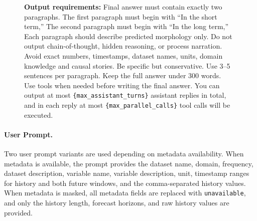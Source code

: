 \documentclass[11pt]{article}
\begin{document}
\begin{figure}[htbp]
\begin{tcolorbox}[
  boxrule=0.25pt,
  colback=promptBgSystem,
  colframe=black,
  colbacktitle=promptBgTitle,
  coltitle=black,
  title={Prompt: System},
  fonttitle=\bfseries,
  fontupper=\small
]
\textbf{Output requirements:} Final answer must contain exactly two paragraphs. The first paragraph must begin with ``In the short term,'' The second paragraph must begin with ``In the long term,'' Each paragraph should describe predicted morphology only. Do not output chain-of-thought, hidden reasoning, or process narration. Avoid exact numbers, timestamps, dataset names, units, domain knowledge and causal stories. Be specific but conservative. Use 3--5 sentences per paragraph. Keep the full answer under 300 words. \\

Use tools when needed before writing the final answer. You can output at most \texttt{\{max\_assistant\_turns\}} assistant replies in total, and in each reply at most \texttt{\{max\_parallel\_calls\}} tool calls will be executed.
\end{tcolorbox}
\end{figure}

\paragraph{User Prompt.}
Two user prompt variants are used depending on metadata availability.
When metadata is available, the prompt provides the dataset name, domain, frequency, dataset description, variable name, variable description, unit, timestamp ranges for history and both future windows, and the comma-separated history values.
When metadata is masked, all metadata fields are replaced with \texttt{unavailable}, and only the history length, forecast horizons, and raw history values are provided.
\end{document}
